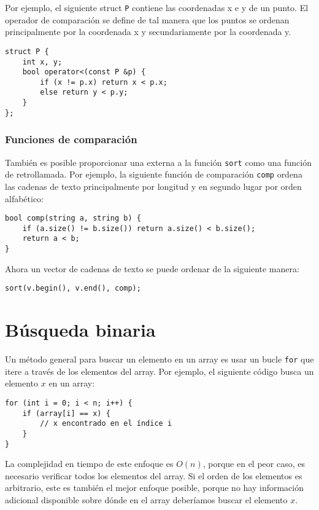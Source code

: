 Por ejemplo, el siguiente struct \texttt{P}
contiene las coordenadas x e y de un punto.
El operador de comparación se define de tal manera que
los puntos se ordenan principalmente por la coordenada x
y secundariamente por la coordenada y.

\begin{lstlisting}
struct P {
    int x, y;
    bool operator<(const P &p) {
        if (x != p.x) return x < p.x;
        else return y < p.y;
    }
};
\end{lstlisting}

\subsubsection{Funciones de comparación}


También es posible proporcionar una
 externa a la función \texttt{sort}
como una función de retrollamada.
Por ejemplo, la siguiente función de comparación \texttt{comp}
ordena las cadenas de texto principalmente por longitud y en segundo lugar
por orden alfabético:

\begin{lstlisting}
bool comp(string a, string b) {
    if (a.size() != b.size()) return a.size() < b.size();
    return a < b;
}
\end{lstlisting}
Ahora un vector de cadenas de texto se puede ordenar de la siguiente manera:
\begin{lstlisting}
sort(v.begin(), v.end(), comp);
\end{lstlisting}

\section{Búsqueda binaria}


Un método general para buscar un elemento
en un array es usar un bucle \texttt{for}
que itere a través de los elementos del array.
Por ejemplo, el siguiente código busca
un elemento $x$ en un array:

\begin{lstlisting}
for (int i = 0; i < n; i++) {
    if (array[i] == x) {
        // x encontrado en el índice i
    }
}
\end{lstlisting}

La complejidad en tiempo de este enfoque es $O(n)$,
porque en el peor caso, es necesario verificar
todos los elementos del array.
Si el orden de los elementos es arbitrario,
este es también el mejor enfoque posible, porque
no hay información adicional disponible sobre dónde
en el array deberíamos buscar el elemento $x$.

